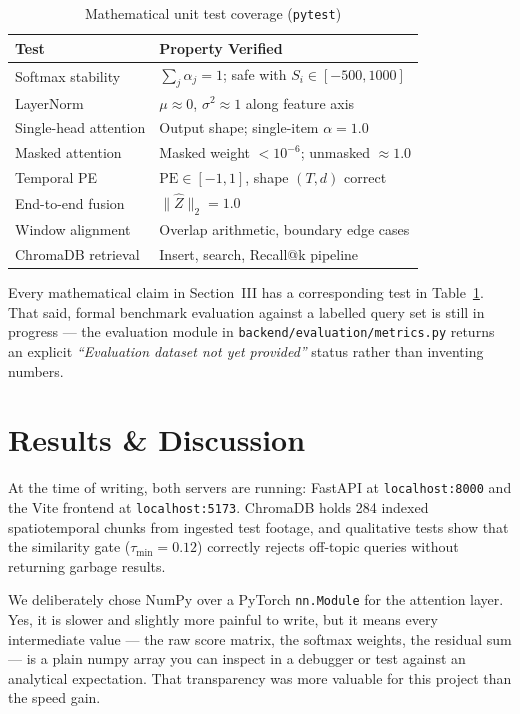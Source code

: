 \documentclass[conference]{IEEEtran}
\begin{document}
\begin{table}[ht]
\centering
\caption{Mathematical unit test coverage (\texttt{pytest})}
\label{tab:tests}
\setlength{\tabcolsep}{3pt}
\begin{tabular}{@{}ll@{}}
\toprule
\textbf{Test} & \textbf{Property Verified} \\ \midrule
Softmax stability     & $\sum_j\alpha_j=1$; safe with $S_i\in[-500,1000]$ \\
LayerNorm             & $\mu\approx 0$, $\sigma^2\approx 1$ along feature axis \\
Single-head attention & Output shape; single-item $\alpha=1.0$ \\
Masked attention      & Masked weight $<10^{-6}$; unmasked $\approx 1.0$ \\
Temporal PE           & $\text{PE}\in[-1,1]$, shape $(T,d)$ correct \\
End-to-end fusion     & $\|\hat{Z}\|_2=1.0$ \\
Window alignment      & Overlap arithmetic, boundary edge cases \\
ChromaDB retrieval    & Insert, search, Recall@k pipeline \\
\bottomrule
\end{tabular}
\end{table}

Every mathematical claim in Section~III has a corresponding test in
Table~\ref{tab:tests}. That said, formal benchmark evaluation against a
labelled query set is still in progress --- the evaluation module in
\texttt{backend/evaluation/metrics.py} returns an explicit
\textit{``Evaluation dataset not yet provided''} status rather than
inventing numbers.

\section{Results \& Discussion}

At the time of writing, both servers are running: FastAPI at
\texttt{localhost:8000} and the Vite frontend at \texttt{localhost:5173}.
ChromaDB holds 284 indexed spatiotemporal chunks from ingested test footage,
and qualitative tests show that the similarity gate ($\tau_{\min}=0.12$)
correctly rejects off-topic queries without returning garbage results.

We deliberately chose NumPy over a PyTorch \texttt{nn.Module} for the
attention layer. Yes, it is slower and slightly more painful to write, but
it means every intermediate value --- the raw score matrix, the softmax
weights, the residual sum --- is a plain numpy array you can inspect in a
debugger or test against an analytical expectation. That transparency was
more valuable for this project than the speed gain.
\end{document}

